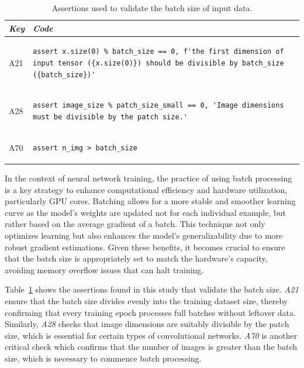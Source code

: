 \begin{table}
\centering
\begin{tabular}{@{}m{} m{}@{}}
\toprule
\emph{\textbf{Key}}&
\emph{\textbf{Code}}\\
\midrule

A21 &
\begin{lstlisting}
assert x.size(0) % batch_size == 0, f'the first dimension of input tensor ({x.size(0)}) should be divisible by batch_size ({batch_size})'
\end{lstlisting}\\

A28 &
\begin{lstlisting}
assert image_size % patch_size_small == 0, 'Image dimensions must be divisible by the patch size.'
\end{lstlisting}\\

A70 &
\begin{lstlisting}
assert n_img > batch_size
\end{lstlisting}\\
\end{tabular}
\caption{Assertions used to validate the batch size of input data.}
\label{tab:batch-size}
\end{table}

In the context of neural network training, the practice of using batch processing is a key strategy to enhance computational efficiency and hardware utilization, particularly GPU cores. Batching allows for a more stable and smoother learning curve as the model's weights are updated not for each individual example, but rather based on the average gradient of a batch. This technique not only optimizes learning but also enhances the model's generalizability due to more robust gradient estimations. Given these benefits, it becomes crucial to ensure that the batch size is appropriately set to match the hardware's capacity, avoiding memory overflow issues that can halt training.

Table~\ref{tab:batch-size} shows the assertions found in this study that validate the batch size. \emph{A21} ensure that the batch size divides evenly into the training dataset size, thereby confirming that every training epoch processes full batches without leftover data. Similarly, \emph{A28} checks that image dimensions are suitably divisible by the patch size, which is essential for certain types of convolutional networks. \emph{A70} is another critical check which confirms that the number of images is greater than the batch size, which is necessary to commence batch processing.

